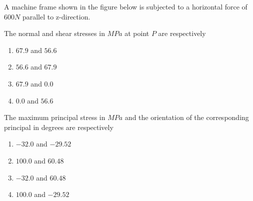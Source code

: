 		A machine frame shown in the figure below is subjected to a horizontal force of $600 N$ parallel to z-direction.
	\item The normal and shear stresses in $MPa$ at point $P$ are respectively 
		\begin{enumerate}
			\item $67.9$ and $56.6$
			\item $56.6$ and $67.9$
			\item $67.9$ and $0.0$
			\item $0.0$ and $56.6$	
		\end{enumerate}
	\item The maximum principal stress in $MPa$ and the orientation of the corresponding principal in degrees are respectively 
		\begin{enumerate}
			\item $-32.0$ and $-29.52$
			\item $100.0$ and $60.48$
			\item $-32.0$ and $60.48$
			\item $100.0$ and $-29.52$
		\end{enumerate}
